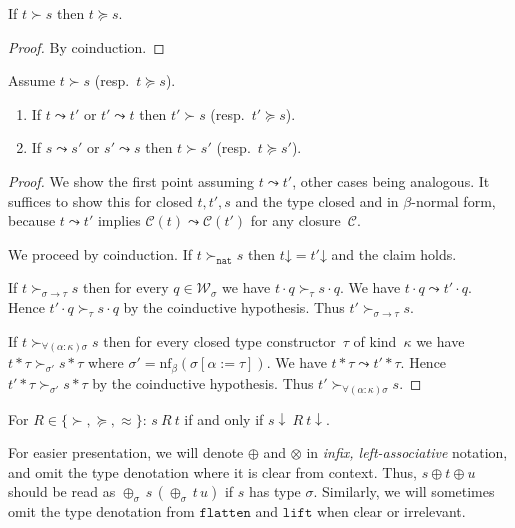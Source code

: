 \documentclass[runningheads,a4paper]{llncs}
\newcommand{\World}{\mathcal{W}}
\newcommand{\cl}{\mathcal{C}}
\newcommand{\nf}{\mathrm{nf}}
\newcommand{\arrtype}{\rightarrow}
\newcommand{\app}[2]{#1 \cdot #2}
\newcommand{\tapp}[2]{#1 * #2}
\newcommand{\subst}[2]{#1:=#2}
\newcommand{\nat}{\mathtt{nat}}
\newcommand{\flatten}{\mathtt{flatten}}
\newcommand{\lift}{\mathtt{lift}}
\newcommand{\da}{\mathord{\downarrow}}
\begin{document}
\begin{lemma}\label{lem_succ_to_succeq}
  If $t \succ s$ then $t \succeq s$.
\end{lemma}

\begin{proof}
  By coinduction.
\end{proof}

\begin{lemma}\label{lem_succ_red}
  Assume $t \succ s$ (resp.~$t \succeq s$).
  \begin{enumerate}
  \item If $t \leadsto t'$ or $t' \leadsto t$ then $t' \succ s$ (resp.~$t' \succeq s$).
  \item If $s \leadsto s'$ or $s' \leadsto s$ then $t \succ s'$
    (resp.~$t \succeq s'$).
  \end{enumerate}
\end{lemma}

\begin{proof}
  We show the first point assuming $t \leadsto t'$, other cases being
  analogous. It suffices to show this for closed $t,t',s$ and the type
  closed and in $\beta$-normal form, because $t \leadsto t'$ implies
  $\cl(t) \leadsto \cl(t')$ for any closure~$\cl$.

  We proceed by coinduction. If $t \succ_\nat s$ then $t\da = t'\da$
  and the claim holds.

  If $t \succ_{\sigma\arrtype\tau} s$ then for every $q \in
  \World_\sigma$ we have $\app{t}{q} \succ_\tau \app{s}{q}$. We have
  $\app{t}{q} \leadsto \app{t'}{q}$. Hence $\app{t'}{q} \succ_\tau
  \app{s}{q}$ by the coinductive hypothesis. Thus $t'
  \succ_{\sigma\arrtype\tau} s$.

  If $t \succ_{\forall(\alpha:\kappa)\sigma} s$ then for every closed
  type constructor~$\tau$ of kind~$\kappa$ we have $\tapp{t}{\tau}
  \succ_{\sigma'} \tapp{s}{\tau}$ where $\sigma' =
  \nf_\beta(\sigma[\subst{\alpha}{\tau}])$. We have $\tapp{t}{\tau}
  \leadsto \tapp{t'}{\tau}$. Hence $\tapp{t'}{\tau} \succ_{\sigma'}
  \tapp{s}{\tau}$ by the coinductive hypothesis. Thus $t'
  \succ_{\forall(\alpha:\kappa)\sigma} s$.
\end{proof}

\begin{corollary}\label{cor_succ_da}
  For $R \in \{\succ,\succeq,\approx\}$: $s\ R\ t$ if and only if
  $s\downarrow\ R\ t\downarrow$.
\end{corollary}

For easier presentation, we will denote $\oplus$ and $\otimes$ in
\emph{infix, left-associative} notation, and omit the type denotation
where it is clear from context. Thus, $s \oplus t \oplus u$ should be
read as $\oplus_\sigma\,s\,(\oplus_\sigma\,t\,u)$ if $s$ has type
$\sigma$. Similarly, we will sometimes omit the type denotation from
$\flatten$ and $\lift$ when clear or irrelevant.
\end{document}
